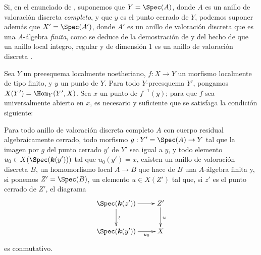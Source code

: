 \begin{remark}[14.5.7]
\label{IV.14.5.7}
Si, en el enunciado de , suponemos que $Y=\Spec(A)$, donde $A$ es un anillo de valoración discreta \emph{completo}, y que $y$ es el punto cerrado de $Y$, podemos suponer además que $X'=\Spec(A')$, donde $A'$ es un anillo de valoración discreta que es una $A$-álgebra \emph{finita}, como se deduce de la demostración de  y del hecho de que un anillo local íntegro, regular y de dimensión $1$ es un anillo de valoración discreta .
\end{remark}

\begin{proposition}[14.5.8]
\label{IV.14.5.8}
Sea $Y$ un preesquema localmente noetheriano, $f:X\to Y$ un morfismo localmente de tipo finito, y $y$ un punto de $Y$.
Para todo $Y$-preesquema $Y'$, pongamos $X(Y')=\Hom_Y(Y',X)$.
Sea $x$ un punto de $f^{-1}(y)$; para que $f$ sea universalmente abierto en $x$, es necesario y suficiente que se satisfaga la condición siguiente:

Para todo anillo de valoración discreta completo $A$ con cuerpo residual algebraicamente cerrado, todo morfismo $g:Y'=\Spec(A)\to Y$ tal que la imagen por $g$ del punto cerrado $y'$ de $Y'$ sea igual a $y$, y todo elemento $u_0\in X(\Spec(\boldsymbol{k}(y')))$ tal que $u_0(y')=x$, existen un anillo de valoración discreta $B$, un homomorfismo local $A\to B$ que hace de $B$ una $A$-álgebra finita y, si ponemos $Z'=\Spec(B)$, un elemento $u\in X(Z')$ tal que, si $z'$ es el punto cerrado de $Z'$, el diagrama
\[
  \xymatrix{
    \Spec(\boldsymbol{k}(z')) \ar[r] \ar[d]^{\wr} & Z' \ar[d]^{u} \\
    \Spec(\boldsymbol{k}(y')) \ar[r]_-{u_0} & X
  }
\]
es conmutativo.
\end{proposition}

